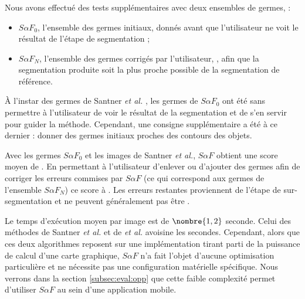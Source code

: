 \subsubsection{}
 
Nous avons effectué des tests supplémentaires  avec deux ensembles de germes,  :
\begin{itemize}
\item ${S \alpha F_{0} }$, l'ensemble des germes initiaux, donnés avant que l'utilisateur ne voit le résultat de l'étape de segmentation ;
\item $S \alpha F_{N}$, l'ensemble des germes corrigés par l'utilisateur, , afin que la segmentation produite soit la plus proche possible de la segmentation de référence.
\end{itemize}

À l'instar des germes de Santner \textit{et al.} \cite{santner2010interactive}, les germes de ${S \alpha F_{0} }$ ont été  sans permettre à l'utilisateur de voir le résultat de la segmentation et de s'en servir pour guider la méthode. Cependant, une consigne supplémentaire a été  à ce dernier : donner des germes initiaux proches des contours des objets.

Avec les germes ${S \alpha F_{0} }$ et les images de Santner \textit{et al.}, $S \alpha F$ obtient une score  moyen de . En permettant à l'utilisateur d'enlever ou d'ajouter des germes afin de corriger les erreurs commises par $S \alpha F$ (ce qui correspond aux germes de l'ensemble $S \alpha F_{N}$) ce score  à . Les erreurs restantes proviennent de l'étape de sur-segmentation et ne peuvent généralement pas être . 

Le temps d'exécution moyen par image est de $\nombre{1,2}$ seconde. Celui des méthodes de Santner \textit{et al.} et de  \textit{et al.} avoisine les  secondes. Cependant, alors que ces deux algorithmes reposent sur une implémentation tirant parti de la puissance de calcul d'une carte graphique, $S \alpha F$ n'a fait l'objet d'aucune optimisation particulière et ne nécessite pas une configuration matérielle spécifique. Nous verrons dans la section \ref{subsec:eval:opp}  que cette faible complexité permet d'utiliser $S \alpha F$ au sein d'une application mobile.


